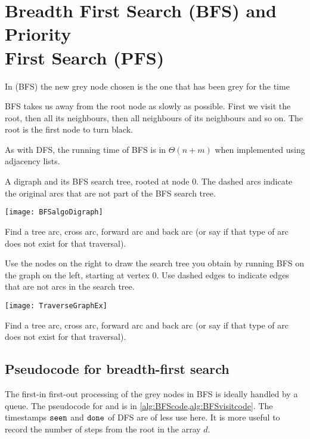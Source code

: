 

\chapter{Breadth First Search (BFS) and Priority\\ First Search (PFS)} %
\begin{Definition}
In  (BFS) the new grey node chosen is the one
that has been grey for the  time
\end{Definition}
 
BFS takes us away from the root node as slowly as possible. 
First we visit the root, then all its neighbours, then all neighbours of its neighbours and so on. 
The root is the first node to turn black.

As with DFS, the running time of BFS is in $\Theta(n+m)$ when implemented using adjacency lists.

\begin{Boxample}[4]
A digraph and its BFS search tree, rooted at node $0$. 
The dashed arcs indicate the original arcs that are not part of the BFS search tree.
\begin{center}
  \texttt{[image: BFSalgoDigraph]} 
\end{center}
Find a tree arc, cross arc, forward arc and back arc (or say if that type of arc does not exist for that traversal).
\end{Boxample}

\begin{Boxample}[4]
Use the nodes on the right to draw the search tree you obtain by running BFS on the graph on the left, starting at vertex $0$. 
Use dashed edges to indicate edges that are not arcs in the search tree.
\begin{center}
  \texttt{[image: TraverseGraphEx]}
\end{center}
Find a tree arc, cross arc, forward arc and back arc (or say if that type of arc does not exist for that traversal).
\end{Boxample}
 
\section{Pseudocode for breadth-first search} \label{sec:bfs}
The first-in first-out processing of the grey nodes in BFS is ideally handled by a queue. 
The pseudocode for  and  is in \cref{alg:BFScode,alg:BFSvisitcode}.
The time\-stamps $\operatorname{\text{\texttt{seen}}}$ and $\operatorname{\text{\texttt{done}}}$ of DFS are of less use here. 
It is more useful to record the number of steps from the root in the array $d$.

